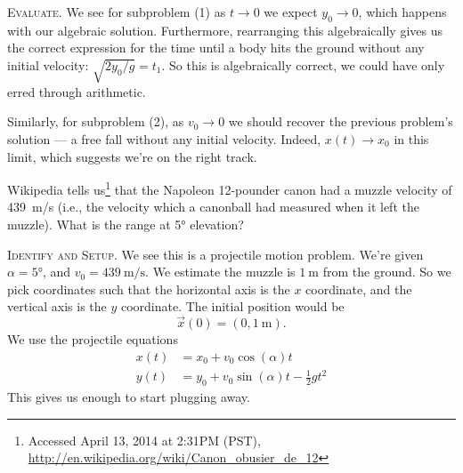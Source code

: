 \textsc{Evaluate.}
We see for subproblem (1) as $t\to0$ we expect $y_{0}\to0$, which
happens with our algebraic solution. Furthermore, rearranging this
algebraically gives us the correct expression for the time until a body
hits the ground without any initial velocity:
$\sqrt{2y_{0}/g}=t_{1}$. So this is algebraically correct, we could have
only erred through arithmetic.

Similarly, for subproblem (2), as $v_{0}\to0$ we should recover the
previous problem's solution --- a free fall without any initial
velocity. Indeed, $x(t)\to x_0$ in this limit, which suggests we're on
the right track.


Wikipedia tells us\footnote{Accessed April 13, 2014 at 2:31PM (PST), \url{http://en.wikipedia.org/wiki/Canon_obusier_de_12}}
that the Napoleon 12-pounder canon had a muzzle velocity of
\SI{439}{\meter/\second} (i.e., the velocity which a canonball had
measured when it left the muzzle). What is the range at \ang{5} elevation?

\textsc{Identify and Setup.} We see this is a projectile motion
problem. We're given $\alpha=\ang{5}$, and
$v_{0}=\SI{439}{\meter/\second}$. We estimate the muzzle is
$\SI{1}{\meter}$ from the ground. So we pick coordinates such that the
horizontal axis is the $x$ coordinate, and the vertical axis is the $y$
coordinate. The initial position would be
\begin{equation}
\vec{x}(0)=(0,\SI{1}{\meter}).
\end{equation}
We use the projectile equations
\begin{equation*}
\begin{split}
x(t) &= x_{0} + v_{0}\cos(\alpha)t\\
y(t) &= y_{0} + v_{0}\sin(\alpha)t - \frac{1}{2}gt^{2}
\end{split}
\end{equation*}
This gives us enough to start plugging away.


